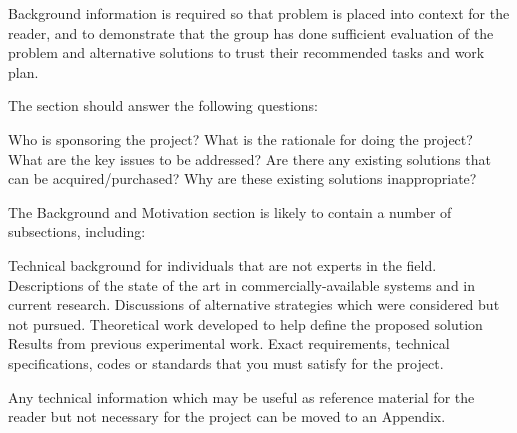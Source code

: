 Background information is required so that problem is placed into context for the reader, and to demonstrate that the group has done sufficient evaluation of the problem and alternative solutions to trust their recommended tasks and work plan.

The section should answer the following questions:

    Who is sponsoring the project?
    What is the rationale for doing the project?
    What are the key issues to be addressed?
    Are there any existing solutions that can be acquired/purchased?   Why are these existing solutions inappropriate?

 

The Background and Motivation section is likely to contain a number of subsections, including:

    Technical background for individuals that are not experts in the field.
    Descriptions of the state of the art in commercially-available systems and in current research.
    Discussions of alternative strategies which were considered but not pursued.
    Theoretical work developed to help define the proposed solution
    Results from previous experimental work.
    Exact requirements, technical specifications, codes or standards that you must satisfy for the project.

Any technical information which may be useful as reference material for the reader but not necessary for the project can be moved to an Appendix.